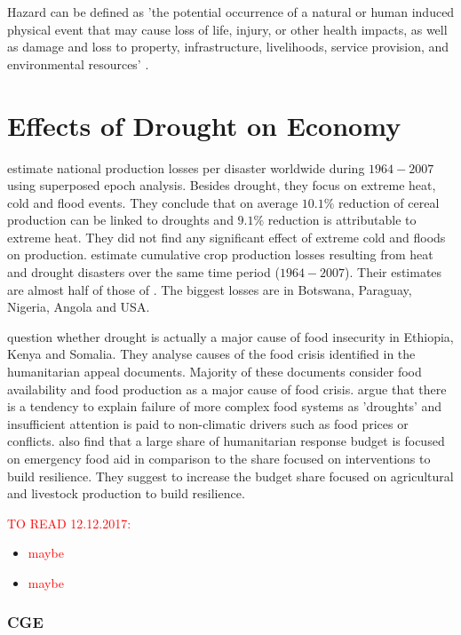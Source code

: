 \documentclass[a4paper,12pt]{article}
\begin{document}
Hazard can be defined as 'the potential occurrence of a natural or human induced
physical event that may cause loss of life, injury, or other
health impacts, as well as damage and loss to property, infrastructure,
livelihoods, service provision, and environmental resources' \citet{IPCC2012ch1}.
 \section*{Effects of Drought on Economy}
 
 \cite{Pedram2016} estimate national production losses per disaster worldwide during ${1964-2007}$ using superposed epoch analysis. Besides drought, they focus on extreme heat, cold and flood events. They conclude that on average $10.1\%$ reduction of cereal production can be linked to droughts and $9.1\%$ reduction is attributable to extreme heat. They did not find any significant effect of extreme cold and floods on production. \cite{Mehrabi2017} estimate cumulative crop production losses resulting from heat and drought disasters over the same time period (${1964-2007}$). Their estimates are almost half of those of \cite{Pedram2016}. The biggest losses are in Botswana, Paraguay, Nigeria, Angola and USA.

 \cite{Sandstorm2017} question whether drought is actually a major cause of food insecurity in Ethiopia, Kenya and Somalia. They analyse causes of the food crisis identified in the humanitarian appeal documents. Majority of these documents consider food availability and food production as a major cause of food crisis. \cite{Sandstorm2017} argue that there is a tendency to explain failure of more complex food systems as 'droughts' and insufficient attention is paid to non-climatic drivers such as food prices or conflicts.  \cite{Sandstorm2017} also find that a large share of humanitarian response budget is focused on emergency food aid in comparison to the share focused on interventions to build resilience. They suggest to increase the budget share focused on agricultural and livestock production to build resilience. 
 
 \textcolor{red}{TO READ 12.12.2017:}
\begin{itemize}
  \item   \textcolor{red}{  \cite{bailey2012} maybe}
  \item   \textcolor{red}{\cite{AMS1997} maybe}
 \end{itemize}
 
\subsubsection*{CGE}
\end{document}
